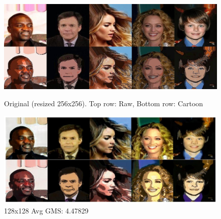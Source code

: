 \documentclass[twoside,english,notitlepage]{report}
\begin{document}
\begin{figure}[H]\label{task1:sample-images}
    \centering
    \includegraphics[width=0.75\linewidth]{task1/originals.jpg}
    \vspace{-10pt}
    \caption{Original (resized 256x256). Top row: Raw, Bottom row: Cartoon}
    \vspace{12pt}
    \includegraphics[width=0.75\linewidth]{task1/top2.jpg}
    \vspace{-10pt}
    \caption{128x128 Avg GMS: 4.47829}
\end{figure}
\end{document}
